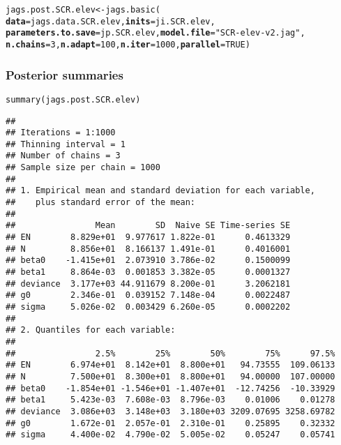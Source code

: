\documentclass[color=usenames,dvipsnames]{beamer}\usepackage[]{graphicx}\usepackage[]{color}
\makeatletter
\newcommand{\hlnum}[1]{\textcolor[rgb]{0.69,0.494,0}{#1}}%
\newcommand{\hlstr}[1]{\textcolor[rgb]{0.749,0.012,0.012}{#1}}%
\newcommand{\hlstd}[1]{\textcolor[rgb]{0,0,0}{#1}}%
\newcommand{\hlkwb}[1]{\textcolor[rgb]{0,0.341,0.682}{#1}}%
\newcommand{\hlkwc}[1]{\textcolor[rgb]{0,0,0}{\textbf{#1}}}%
\newcommand{\hlkwd}[1]{\textcolor[rgb]{0.004,0.004,0.506}{#1}}%
\newenvironment{kframe}{%
 \def\at@end@of@kframe{}%
 \ifinner\ifhmode%
  \def\at@end@of@kframe{\end{minipage}}%
  \begin{minipage}{\columnwidth}%
 \fi\fi%
 \def\FrameCommand##1{\hskip\@totalleftmargin \hskip-\fboxsep
 \colorbox{shadecolor}{##1}\hskip-\fboxsep
     \hskip-\linewidth \hskip-\@totalleftmargin \hskip\columnwidth}%
 \MakeFramed {\advance\hsize-\width
   \@totalleftmargin\z@ \linewidth\hsize
   \@setminipage}}%
 {\par\unskip\endMakeFramed%
 \at@end@of@kframe}
\newenvironment{knitrout}{}{} %
\makeatother
\begin{document}
\begin{frame}[fragile]
\begin{knitrout}
\begin{kframe}
{\ttfamily\noindent\itshape\color{messagecolor}{\#\# \\\#\# Attaching package: 'jagsUI'}}

{\ttfamily\noindent\itshape\color{messagecolor}{\#\# The following object is masked from 'package:coda':\\\#\# \\\#\# \ \ \ \ traceplot}}\begin{alltt}
\hlstd{jags.post.SCR.elev} \hlkwb{<-} \hlkwd{jags.basic}\hlstd{(}
    \hlkwc{data}\hlstd{=jags.data.SCR.elev,} \hlkwc{inits}\hlstd{=ji.SCR.elev,}
    \hlkwc{parameters.to.save}\hlstd{=jp.SCR.elev,} \hlkwc{model.file}\hlstd{=}\hlstr{"SCR-elev-v2.jag"}\hlstd{,}
    \hlkwc{n.chains}\hlstd{=}\hlnum{3}\hlstd{,} \hlkwc{n.adapt}\hlstd{=}\hlnum{100}\hlstd{,} \hlkwc{n.iter}\hlstd{=}\hlnum{1000}\hlstd{,} \hlkwc{parallel}\hlstd{=}\hlnum{TRUE}\hlstd{)}
\end{alltt}
\end{kframe}
\end{knitrout}
\end{frame}




\begin{frame}[fragile]
  \frametitle{Posterior summaries}
\begin{knitrout}\tiny
{}\color{fgcolor}\begin{kframe}
\begin{alltt}
\hlkwd{summary}\hlstd{(jags.post.SCR.elev)}
\end{alltt}
\begin{verbatim}
## 
## Iterations = 1:1000
## Thinning interval = 1 
## Number of chains = 3 
## Sample size per chain = 1000 
## 
## 1. Empirical mean and standard deviation for each variable,
##    plus standard error of the mean:
## 
##                Mean        SD  Naive SE Time-series SE
## EN        8.829e+01  9.977617 1.822e-01      0.4613329
## N         8.856e+01  8.166137 1.491e-01      0.4016001
## beta0    -1.415e+01  2.073910 3.786e-02      0.1500099
## beta1     8.864e-03  0.001853 3.382e-05      0.0001327
## deviance  3.177e+03 44.911679 8.200e-01      3.2062181
## g0        2.346e-01  0.039152 7.148e-04      0.0022487
## sigma     5.026e-02  0.003429 6.260e-05      0.0002202
## 
## 2. Quantiles for each variable:
## 
##                2.5%        25%        50%        75%      97.5%
## EN        6.974e+01  8.142e+01  8.800e+01   94.73555  109.06133
## N         7.500e+01  8.300e+01  8.800e+01   94.00000  107.00000
## beta0    -1.854e+01 -1.546e+01 -1.407e+01  -12.74256  -10.33929
## beta1     5.423e-03  7.608e-03  8.796e-03    0.01006    0.01278
## deviance  3.086e+03  3.148e+03  3.180e+03 3209.07695 3258.69782
## g0        1.672e-01  2.057e-01  2.310e-01    0.25895    0.32332
## sigma     4.400e-02  4.790e-02  5.005e-02    0.05247    0.05741
\end{verbatim}
\end{kframe}
\end{knitrout}
\end{frame}
\end{document}
